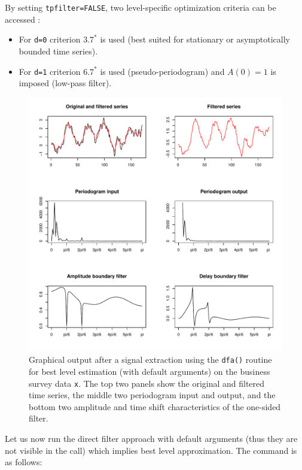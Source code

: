 \documentclass[a4paper]{article}
\begin{document}
\noindent By setting \texttt{tpfilter=FALSE}, two level-specific
optimization criteria can be accessed :
\begin{itemize}
\item For \texttt{d=0} criterion $3.7^*$ is used (best suited for
  stationary or asymptotically bounded time series). 
\item For \texttt{d=1} criterion $6.7^*$ is used (pseudo-periodogram)
  and $A(0)=1$ is imposed (low-pass filter). 
\end{itemize}
\begin{figure}[htb!] 
\begin{center}
\includegraphics{levelfilter_la5_exp2k5_pbd1k02_pb_14_sb7_limamp5_nloops10_d0}
\caption{Graphical output after a signal extraction using the
  \texttt{dfa()} routine for best level estimation (with default
  arguments) on the business survey data \texttt{x}. The top two
  panels show the original and filtered time series, the middle two
  periodogram input and output, and the bottom two amplitude and time
  shift characteristics of the one-sided filter.\label{fig1}}
\end{center}
\end{figure}
Let us now run the direct filter approach with default arguments (thus
they are not visible in the call) which implies best level
approximation. The command is as follows:
\end{document}
